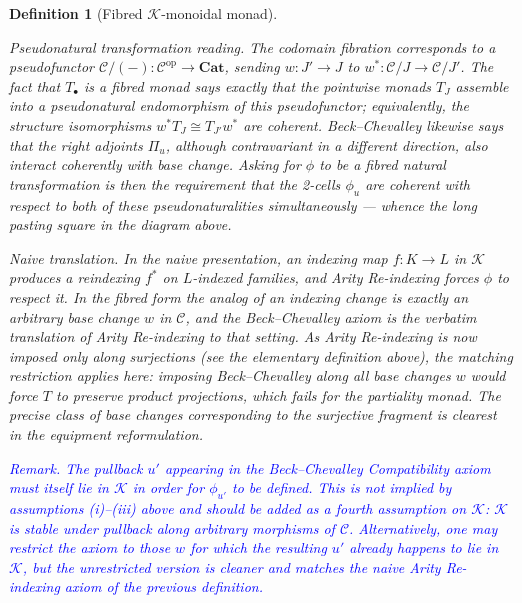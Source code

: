 \documentclass{article}
\newtheorem{definition}{Definition}
\begin{document}
\begin{definition}[Fibred $\mathcal{K}$-monoidal monad]
\begin{enumerate}
    \smallskip
    \noindent \emph{Pseudonatural transformation reading.} The codomain fibration corresponds to a pseudofunctor $\mathcal{C}/(-) : \mathcal{C}^{\mathrm{op}} \to \mathbf{Cat}$, sending $w : J' \to J$ to $w^* : \mathcal{C}/J \to \mathcal{C}/J'$. The fact that $T_\bullet$ is a \emph{fibred} monad says exactly that the pointwise monads $T_J$ assemble into a pseudonatural endomorphism of this pseudofunctor; equivalently, the structure isomorphisms $w^* T_J \cong T_{J'} w^*$ are coherent. Beck--Chevalley likewise says that the right adjoints $\Pi_u$, although contravariant in a different direction, also interact coherently with base change. Asking for $\phi$ to be a fibred natural transformation is then the requirement that the \emph{2-cells} $\phi_u$ are coherent with respect to both of these pseudonaturalities simultaneously --- whence the long pasting square in the diagram above.

    \smallskip
    \noindent \emph{Naive translation.} In the naive presentation, an indexing map $f : K \to L$ in $\mathcal{K}$ produces a reindexing $f^*$ on $L$-indexed families, and Arity Re-indexing forces $\phi$ to respect it. In the fibred form the analog of an indexing change is exactly an arbitrary base change $w$ in $\mathcal{C}$, and the Beck--Chevalley axiom is the verbatim translation of Arity Re-indexing to that setting. As Arity Re-indexing is now imposed only along \emph{surjections} (see the elementary definition above), the matching restriction applies here: imposing Beck--Chevalley along \emph{all} base changes $w$ would force $T$ to preserve product projections, which fails for the partiality monad. The precise class of base changes corresponding to the surjective fragment is clearest in the equipment reformulation.
\end{enumerate}

\textcolor{blue}{\emph{Remark.} The pullback $u'$ appearing in the Beck--Chevalley Compatibility axiom must itself lie in $\mathcal{K}$ in order for $\phi_{u'}$ to be defined. This is not implied by assumptions (i)--(iii) above and should be added as a fourth assumption on $\mathcal{K}$: \emph{$\mathcal{K}$ is stable under pullback along arbitrary morphisms of $\mathcal{C}$}. Alternatively, one may restrict the axiom to those $w$ for which the resulting $u'$ already happens to lie in $\mathcal{K}$, but the unrestricted version is cleaner and matches the naive Arity Re-indexing axiom of the previous definition.}
\end{definition}
\end{document}
